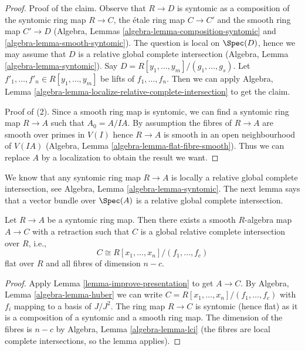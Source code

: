 \begin{proof}
\medskip\noindent
Proof of the claim. Observe that $R \to D$ is syntomic as a composition
of the syntomic ring map $R \to C$, the \'etale ring map $C \to C'$ and the
smooth ring map $C' \to D$ (Algebra, Lemmas
\ref{algebra-lemma-composition-syntomic} and
\ref{algebra-lemma-smooth-syntomic}).
The question is local on $\Spec(D)$, hence we
may assume that $D$ is a relative global complete intersection
(Algebra, Lemma \ref{algebra-lemma-syntomic}).
Say $D = R[y_1, \ldots, y_m]/(g_1, \ldots, g_s)$.
Let $f'_1, \ldots, f'_n \in R[y_1, \ldots, y_m]$ be lifts of
$f_1, \ldots, f_n$. Then we can apply
Algebra, Lemma \ref{algebra-lemma-localize-relative-complete-intersection}
to get the claim.

\medskip\noindent
Proof of (2). Since a smooth ring map is syntomic, we can find
a syntomic ring map $R \to A$ such that $A_0 = A/IA$.
By assumption the fibres of $R \to A$ are smooth over primes in $V(I)$
hence $R \to A$ is smooth in an open neighbourhood of $V(IA)$
(Algebra, Lemma \ref{algebra-lemma-flat-fibre-smooth}).
Thus we can replace $A$ by a localization to obtain the result we want.
\end{proof}

\noindent
We know that any syntomic ring map $R \to A$ is locally a relative global
complete intersection, see
Algebra, Lemma \ref{algebra-lemma-syntomic}.
The next lemma says that a vector bundle over $\Spec(A)$ is
a relative global complete intersection.

\begin{lemma}
\label{lemma-syntomic-complete-intersection}
Let $R \to A$ be a syntomic ring map. Then there exists a smooth $R$-algebra
map $A \to C$ with a retraction such that $C$ is a global relative complete
intersection over $R$, i.e.,
$$
C \cong R[x_1, \ldots, x_n]/(f_1, \ldots, f_c)
$$
flat over $R$ and all fibres of dimension $n - c$.
\end{lemma}

\begin{proof}
Apply Lemma \ref{lemma-improve-presentation} to get $A \to C$.
By Algebra, Lemma \ref{algebra-lemma-huber}
we can write $C = R[x_1, \ldots, x_n]/(f_1, \ldots, f_c)$
with $f_i$ mapping to a basis of $J/J^2$.
The ring map $R \to C$ is syntomic (hence flat)
as it is a composition of a syntomic and a smooth ring map.
The dimension of the fibres is $n - c$ by
Algebra, Lemma \ref{algebra-lemma-lci}
(the fibres are local complete intersections, so the lemma applies).
\end{proof}


